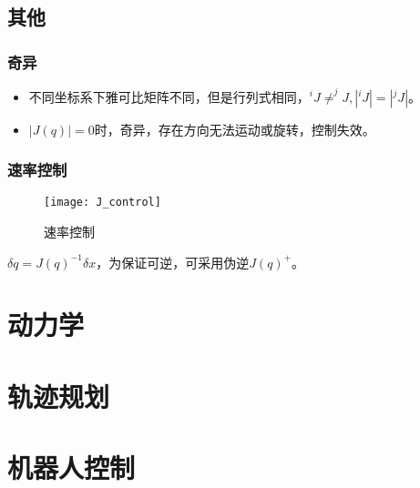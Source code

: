 \documentclass[
12pt, %
a4paper, 
oneside, %
headinclude,footinclude, %
]{scrartcl}
\begin{document}
\subsection{其他}
\subsubsection{奇异}
\begin{itemize}
\item 不同坐标系下雅可比矩阵不同，但是行列式相同，$ ^i J \neq ^j J, |^i J| = |^j J| $。
\item $ |J(q)| = 0 $时，奇异，存在方向无法运动或旋转，控制失效。
\end{itemize} 
\subsubsection{速率控制}
\begin{figure}[H]
\centering 
\texttt{[image: J\_control]} 
\caption[速率控制]{速率控制}
\end{figure}

$ \delta q = J(q)^{-1} \delta x $，为保证可逆，可采用伪逆$ J(q)^+ $。
\section{动力学}
\section{轨迹规划}
\section{机器人控制}
\end{document}
